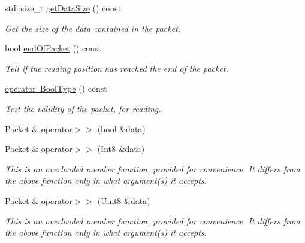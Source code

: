 \begin{DoxyCompactItemize}
std\+::size\+\_\+t \mbox{\hyperlink{classsf_1_1_packet_a0fae6eccf2ca704fc5099cd90a9f56f7}{get\+Data\+Size}} () const
\begin{DoxyCompactList}\small\item\em Get the size of the data contained in the packet. \end{DoxyCompactList}\item 
bool \mbox{\hyperlink{classsf_1_1_packet_a61e354fa670da053907c14b738839560}{end\+Of\+Packet}} () const
\begin{DoxyCompactList}\small\item\em Tell if the reading position has reached the end of the packet. \end{DoxyCompactList}\item 
\mbox{\hyperlink{classsf_1_1_packet_a8ab20be4a63921b7cb1a4d8ca5c30f75}{operator Bool\+Type}} () const
\begin{DoxyCompactList}\small\item\em Test the validity of the packet, for reading. \end{DoxyCompactList}\item 
\mbox{\hyperlink{classsf_1_1_packet}{Packet}} \& \mbox{\hyperlink{classsf_1_1_packet_af8e26c63ba9bdccd262565ff0d3eeba2}{operator$>$$>$}} (bool \&data)
\item 
\mbox{\label{classsf_1_1_packet_a70fd5abb9095b5335b79c0cefd17b222}} 
\mbox{\hyperlink{classsf_1_1_packet}{Packet}} \& \mbox{\hyperlink{classsf_1_1_packet_a70fd5abb9095b5335b79c0cefd17b222}{operator$>$$>$}} (Int8 \&data)
\begin{DoxyCompactList}\small\item\em This is an overloaded member function, provided for convenience. It differs from the above function only in what argument(s) it accepts. \end{DoxyCompactList}\item 
\mbox{\label{classsf_1_1_packet_aa67738284a7efc16c7594b358ef35510}} 
\mbox{\hyperlink{classsf_1_1_packet}{Packet}} \& \mbox{\hyperlink{classsf_1_1_packet_aa67738284a7efc16c7594b358ef35510}{operator$>$$>$}} (Uint8 \&data)
\begin{DoxyCompactList}\small\item\em This is an overloaded member function, provided for convenience. It differs from the above function only in what argument(s) it accepts. \end{DoxyCompactList}\item 

\end{DoxyCompactItemize}
